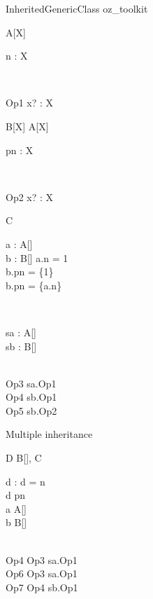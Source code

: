 \begin{zsection}
  \SECTION InheritedGenericClass \parents oz\_toolkit
\end{zsection}

\begin{class}{A[X]}
  \begin{state}
    n : X
  \end{state}\\
  \begin{op}{Op1}
    x? : X
  \end{op}
\end{class}

\begin{class}{B[X]}
  A[X]\\
  \begin{state}
    pn : \power X
  \end{state}\\
  \begin{op}{Op2}
    x? : \power X
  \end{op}
\end{class}

\begin{class}{C}
  \begin{axdef}
    a : A[\nat]\\
    b : B[\nat]
  \where
    a.n = 1\\
    b.pn = \{1\}\\
    b.pn = \{a.n\}
  \end{axdef}\\
  \begin{state}
    sa : A[\nat]\\
    sb : B[\nat]
  \end{state}\\
  Op3 \sdef sa.Op1\\
  Op4 \sdef sb.Op1\\
  Op5 \sdef sb.Op2
\end{class}

Multiple inheritance
\begin{class}{D}
  B[\nat], C\\
  \begin{state}
    d : \nat
  \where
    d = n\\
    d \in pn\\
    a \in A[\nat]\\
    b \in B[\nat]
  \end{state}\\
  Op4 \sdef Op3 \land sa.Op1\\
  Op6 \sdef Op3 \land sa.Op1\\
  Op7 \sdef Op4 \land sb.Op1
\end{class}

